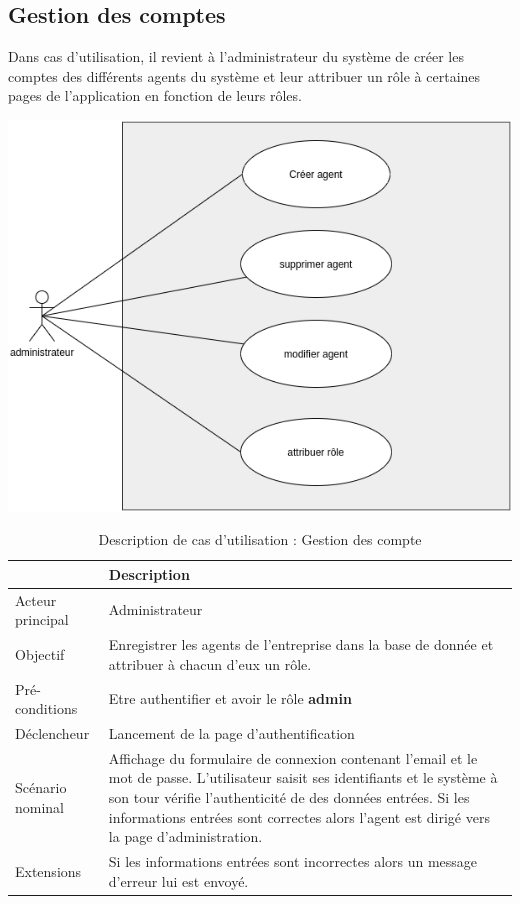 		\subsection*{Gestion des comptes}
		Dans cas d'utilisation, il revient à l'administrateur du système de créer les comptes des différents agents du système et leur attribuer un rôle à certaines pages de l'application en fonction de leurs rôles.
			\begin{center}
				\includegraphics[scale=0.5]{chap_2/gestion-compte.png}
				\label{cas d'utilisateur gestion compte}
			\end{center}
			\begin{table}[H]
				\begin{center}
					 {\renewcommand{\arraystretch}{1.5}\begin{tabularx}{\textwidth}{|l|X|}
							\hline & Description \\
							\hline Acteur principal & Administrateur\\
							\hline Objectif & Enregistrer les agents de l'entreprise dans la base de donnée et attribuer à chacun d'eux un rôle.\\
							\hline Pré-conditions & Etre authentifier et avoir le rôle \textbf{admin}\\
							\hline Déclencheur & Lancement de la page d'authentification\\
							\hline
							Scénario nominal & Affichage du formulaire de connexion contenant l'email et le mot de passe. 
							L'utilisateur saisit ses identifiants et le système à son tour vérifie l'authenticité de des données entrées.\newline
							Si les informations entrées sont correctes alors l'agent est dirigé vers la page d'administration.
							\\
							\hline
							Extensions &  Si les informations entrées sont incorrectes alors un message d'erreur lui est envoyé. \\
							\hline               
					\end{tabularx}}
				\end{center}
				\caption{Description de cas d'utilisation : Gestion des compte} 
				\label{Table compte}
			\end{table}
